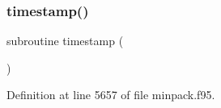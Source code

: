 \mbox{\label{minpack_8f95_a44fdaa08281ed3009542bc9257fa965d}} 
\subsubsection{\texorpdfstring{timestamp()}{timestamp()}}
{\footnotesize\ttfamily subroutine timestamp (\begin{DoxyParamCaption}{ }\end{DoxyParamCaption})}



Definition at line 5657 of file minpack.\+f95.

